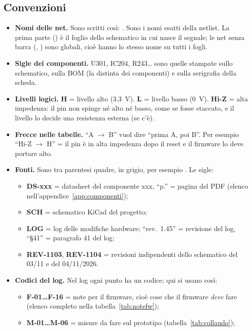 \subsection*{Convenzioni}
\begin{itemize}
\item \textbf{Nomi delle net.} Sono scritti così: . Sono i nomi esatti della netlist. La prima parte () è il foglio dello schematico in cui nasce il segnale; le net senza barra (, ) sono globali, cioè hanno lo stesso nome su tutti i fogli.
\item \textbf{Sigle dei componenti.} U301, IC204, R243\ldots{} sono quelle stampate sullo schematico, sulla BOM (la distinta dei componenti) e sulla serigrafia della scheda.
\item \textbf{Livelli logici.} \textbf{H} = livello alto (\SI{3.3}{\volt}). \textbf{L} = livello basso (\SI{0}{\volt}). \textbf{Hi-Z} = alta impedenza: il pin non spinge né alto né basso, come se fosse staccato, e il livello lo decide una resistenza esterna (se c'è).
\item \textbf{Frecce nelle tabelle.} \enquote{A $\to$ B} vuol dire \enquote{prima A, poi B}. Per esempio \enquote{Hi-Z $\to$ H} = il pin è in alta impedenza dopo il reset e il firmware lo deve portare alto.
\item \textbf{Fonti.} Sono tra parentesi quadre, in grigio, per esempio . Le sigle:
 \begin{itemize}
 \item \textbf{DS-xxx} = datasheet del componente xxx, \enquote{p.} = pagina del PDF (elenco nell'appendice~\ref{app:componenti});
 \item \textbf{SCH} = schematico KiCad del progetto;
 \item \textbf{LOG} = log delle modifiche hardware; \enquote{rev.\ 1.45} = revisione del log, \enquote{§41} = paragrafo 41 del log;
 \item \textbf{REV-1103}, \textbf{REV-1104} = revisioni indipendenti dello schematico del 03/11 e del 04/11/2026.
 \end{itemize}
\item \textbf{Codici del log.} Nel log ogni punto ha un codice; qui si usano così:
 \begin{itemize}
 \item \textbf{F-01\ldots F-16} = note per il firmware, cioè cose che il firmware \emph{deve} fare (elenco completo nella tabella~\ref{tab:notefw});
 \item \textbf{M-01\ldots M-06} = misure da fare sul prototipo (tabella~\ref{tab:collaudo});

\end{itemize}
\end{itemize}
